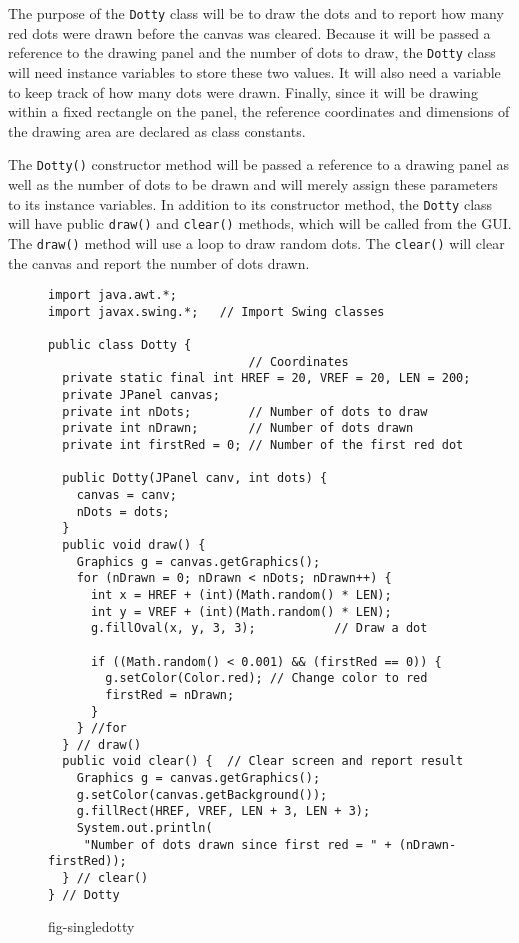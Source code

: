 \noindent The purpose of the {\tt Dotty} class will be to draw the
dots and to report how many red dots were drawn before the canvas was
cleared.  Because it will be passed a reference to the drawing panel
and the number of dots to draw, the {\tt Dotty} class will need
instance variables to store these two values.  It will also need a
variable to keep track of how many
dots were drawn.  Finally, since it will be drawing within a fixed
rectangle on the panel, the reference coordinates and dimensions
of the drawing area are declared as class constants. 

The {\tt Dotty()} constructor method will be passed a reference to a
drawing panel as well as the number of dots to be drawn and will
merely assign these parameters to its instance variables.   In addition
to its constructor method, the {\tt Dotty} class will have public
{\tt draw()} and {\tt clear()} methods, which will be called from the
GUI.   The {\tt draw()} method will use a loop to draw random
dots.  The {\tt clear()} will clear the canvas and report the
number of dots drawn.

\begin{figure}[h!]
\jjjprogstart
\begin{jjjlisting}[30pc]
\begin{lstlisting}
import java.awt.*;
import javax.swing.*;   // Import Swing classes

public class Dotty {
                            // Coordinates
  private static final int HREF = 20, VREF = 20, LEN = 200; 
  private JPanel canvas;
  private int nDots;        // Number of dots to draw
  private int nDrawn;       // Number of dots drawn
  private int firstRed = 0; // Number of the first red dot

  public Dotty(JPanel canv, int dots) {
    canvas = canv;
    nDots = dots;
  }
  public void draw() {
    Graphics g = canvas.getGraphics();
    for (nDrawn = 0; nDrawn < nDots; nDrawn++) {
      int x = HREF + (int)(Math.random() * LEN);
      int y = VREF + (int)(Math.random() * LEN);
      g.fillOval(x, y, 3, 3);           // Draw a dot

      if ((Math.random() < 0.001) && (firstRed == 0)) {
        g.setColor(Color.red); // Change color to red
        firstRed = nDrawn;
      }
    } //for
  } // draw()
  public void clear() {  // Clear screen and report result
    Graphics g = canvas.getGraphics();
    g.setColor(canvas.getBackground());
    g.fillRect(HREF, VREF, LEN + 3, LEN + 3);
    System.out.println(
     "Number of dots drawn since first red = " + (nDrawn-firstRed));
  } // clear()
} // Dotty
\end{lstlisting}
\end{jjjlisting}
{fig-singledotty}
\end{figure}

